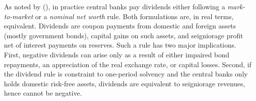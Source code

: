 \documentclass[american]{scrartcl}
\newcommand{\citein}[1]{\citeauthor{#1} (\citeyear{#1})}
\begin{document}
As noted by \citein{Hall2015}, in practice central banks pay dividends either following a \textit{mark-to-market} or a \textit{nominal net worth} rule. Both formulations are, in real terms, equivalent. Dividends are coupon payments from domestic and foreign assets (mostly government bonds), capital gains on such assets, and seigniorage profit net of interest payments on reserves. Such a rule has two major implications. First, negative dividends can arise only as a result of either impaired bond repayments, an appreciation of the real exchange rate, or capital losses. Second, if the dividend rule is constraint to one-period solvency and the central banks only holds domestic risk-free assets, dividends are equivalent to seigniorage revenues, hence cannot be negative.


\newpage
\nocite{*}
\printbibliography
\end{document}
